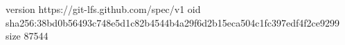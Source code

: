 version https://git-lfs.github.com/spec/v1
oid sha256:38bd0b56493c748e5d1c82b4544b4a29f6d2b15eca504c1fc397edf4f2ce9299
size 87544
